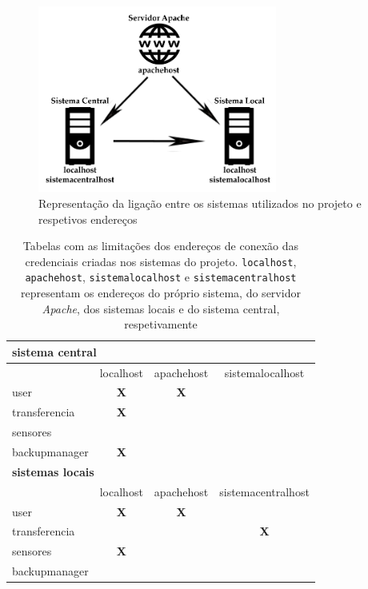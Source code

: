 \documentclass[11pt,twoside,a4paper]{report}
\begin{document}
\begin{figure}
	\begin{center}
		\includegraphics[width=0.7\textwidth]{ligacao_entre_sistemas} %
		\caption[Representação da ligação entre os sistemas]{Representação da ligação entre os sistemas utilizados no projeto e respetivos endereços}
		\label{fig:utilizadores2}
	\end{center}
\end{figure}
\begin{table}
	\centering
	\begin{tabular}{|l|c|c|c|}
		\multicolumn{4}{l}{\textbf{sistema central}} \\ \hline
		\makecell{} & localhost & apachehost & sistemalocalhost \\ \hline
		user & \textbf{X} & \textbf{X} & \\ \hline
		transferencia & \textbf{X} & & \\ \hline
		sensores & & & \\ \hline
		backupmanager & \textbf{X} & & \\ \hline
		\multicolumn{4}{l}{\textbf{sistemas locais}} \\ \hline
		\makecell{} & localhost & apachehost & sistemacentralhost \\ \hline
		user & \textbf{X} & \textbf{X} & \\ \hline
		transferencia & & & \textbf{X} \\ \hline
		sensores & \textbf{X} & & \\ \hline
		backupmanager & & & \\ \hline
	\end{tabular}
	\caption[Tabelas com as limitações dos endereços de conexão das credenciais nos sistemas]{Tabelas com as limitações dos endereços de conexão das credenciais criadas nos sistemas do projeto. \texttt{localhost}, \texttt{apachehost}, \texttt{sistemalocalhost} e \texttt{sistemacentralhost} representam os endereços do próprio sistema, do servidor \textit{Apache}, dos sistemas locais e do sistema central, respetivamente}
	\label{tab:utilizadores3}
\end{table}
\end{document}
